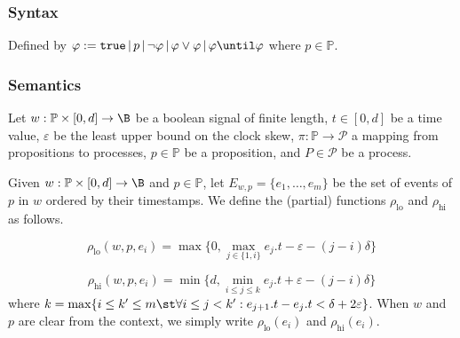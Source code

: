 

\subsubsection*{Syntax}
Defined by
$ \varphi := \texttt{true} \,|\, p \,|\, \lnot \varphi \,|\, \varphi \lor \varphi \,|\, \varphi \until \varphi $
where $p \in \mathbb{P}$.

\subsubsection*{Semantics}
Let $w : \mathbb{P} \times [0,d] \to \B$ be a boolean signal of finite length, $t \in [0,d]$ be a time value, $\varepsilon$ be the least upper bound on the clock skew, $\pi : \mathbb{P} \to \mathcal{P}$ a mapping from propositions to processes, $p \in \mathbb{P}$ be a proposition, and $P \in \mathcal{P}$ be a process.

Given $w : \mathbb{P} \times [0,d] \to \B$ and $p \in \mathbb{P}$, let $E_{w,p} = \{e_1, \ldots, e_m\}$ be the set of events of $p$ in $w$ ordered by their timestamps.
We define the (partial) functions $\rho_{\text{lo}}$ and $\rho_{\text{hi}}$ as follows.

$$ \rho_{\text{lo}}(w, p, e_i) = \max\{0, \max_{j \in \{1, i\}} e_j.t - \varepsilon - (j-i)\delta\} $$

$$ \rho_{\text{hi}}(w, p, e_i) = \min\{d, \min_{i \leq j \leq k} e_j.t + \varepsilon - (j-i)\delta\} $$
where $k = \max \{i \leq k' \leq m \st \forall i \leq j < k' : e_{j + 1}.t - e_j.t < \delta + 2\varepsilon\}$.
When $w$ and $p$ are clear from the context, we simply write $\rho_{\text{lo}}(e_i)$ and $\rho_{\text{hi}}(e_i)$.

